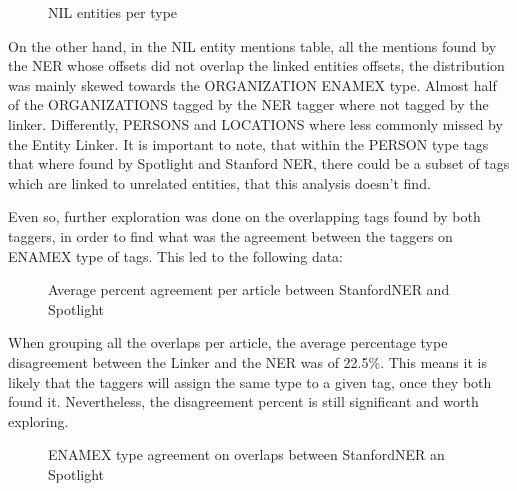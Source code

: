\begin{figure}
  \label{fig:nilspertype}
  \centering
  \caption{NIL entities per type}
\end{figure}

On the other hand, in the NIL entity mentions table, all the mentions found by the NER whose offsets did not overlap the linked entities offsets,
the distribution was mainly skewed towards the ORGANIZATION ENAMEX type.
Almost half of the ORGANIZATIONS tagged by the NER tagger where not tagged by the linker.
Differently, PERSONS and LOCATIONS where less commonly missed by the Entity Linker.
It is important to note, that within the PERSON type tags that where found by Spotlight and Stanford NER, there could be a subset of tags which are linked to unrelated entities,
that this analysis doesn't find.

Even so, further exploration was done on the overlapping tags found by both taggers,
in order to find what was the agreement between the taggers on ENAMEX type of tags. 
This led to the following data:

\begin{figure}
  \label{fig:avgagreementpercentnernel}
  \centering
  \caption{Average percent agreement per article between StanfordNER and Spotlight}
\end{figure}

When grouping all the overlaps per article, the average percentage type disagreement between the Linker and the NER was of 22.5\%.
This means it is likely that the taggers will assign the same type to a given tag, once they both found it.
Nevertheless, the disagreement percent is still significant and worth exploring.

\begin{figure}
    \centering
    \begin{subfigure}[Disagreement on overlapping tags per type]
    \end{subfigure}%
    \begin{subfigure}[Overall overlapped tags agreement between StanfordNER and Spotlight]
        \label{fig:agreementvsdisagreementpercent}
    \end{subfigure}%
    \begin{subfigure}[Overall overlapped tags agreement between StanfordNER and Spotlight by type]
        \label{fig:agreementnernelbytype}
    \end{subfigure}%
    \caption{ENAMEX type agreement on overlaps between StanfordNER an Spotlight}
\end{figure}

